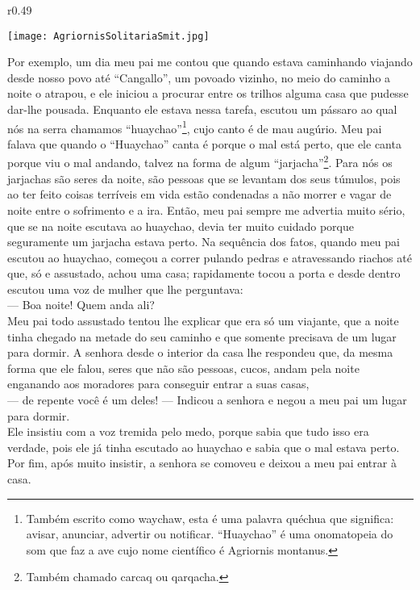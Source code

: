 \ifdefined\EnableIncludeImages
\begin{wrapfigure}{r}{0.49\textwidth}
  \begin{center}
  \vspace{-20pt}
    \texttt{[image: AgriornisSolitariaSmit.jpg]}
  \end{center}
  \vspace{-20pt}
\end{wrapfigure}
\fi
Por exemplo, um dia meu pai me contou que quando estava caminhando viajando desde nosso povo até ``Cangallo'', um povoado vizinho, no meio do caminho a noite o atrapou, e ele iniciou a procurar entre os trilhos alguma casa que pudesse dar-lhe pousada. Enquanto ele estava nessa tarefa, escutou um pássaro ao qual nós na serra chamamos ``huaychao''\footnote{Também escrito como waychaw, esta é uma palavra quéchua que significa: avisar, anunciar, advertir ou notificar. ``Huaychao'' é uma onomatopeia do som que faz a ave cujo nome científico é Agriornis montanus.}, cujo canto é de mau augúrio.
Meu pai falava que quando o ``Huaychao'' canta é porque o mal está perto, que ele canta porque viu o mal andando, talvez na forma de algum ``jarjacha''\footnote{Também chamado carcaq ou qarqacha.}. Para nós os jarjachas são seres da noite, são pessoas que se levantam dos seus túmulos, pois ao ter feito coisas terríveis em vida estão condenadas a não morrer e vagar de noite entre o sofrimento e a ira. 
Então, meu pai sempre me advertia muito sério, que se na noite escutava ao huaychao, devia ter muito cuidado porque seguramente um jarjacha estava perto. 
Na sequência dos fatos, quando meu pai escutou ao huaychao, começou a correr pulando pedras e atravessando riachos até que, só e assustado, achou uma casa; rapidamente tocou a porta e desde dentro escutou uma voz de mulher que lhe perguntava:\\\indent
--- Boa noite! Quem anda ali?\\\indent
Meu pai todo assustado tentou lhe explicar que era só um viajante, que a noite tinha chegado na metade do seu caminho e que somente precisava de um lugar para dormir. A senhora desde o interior da casa lhe respondeu que, da mesma forma que ele falou, seres que não são pessoas, cucos, andam pela noite enganando aos moradores para conseguir entrar a suas casas,\\\indent
--- de repente você é um deles! --- Indicou a senhora e negou a meu pai um lugar para dormir.\\\indent
Ele insistiu com a voz tremida pelo medo, porque sabia que tudo isso era verdade, pois ele já tinha escutado ao huaychao e sabia que o mal estava perto. Por fim, após muito insistir, a senhora se comoveu e deixou a meu pai entrar à casa. 
